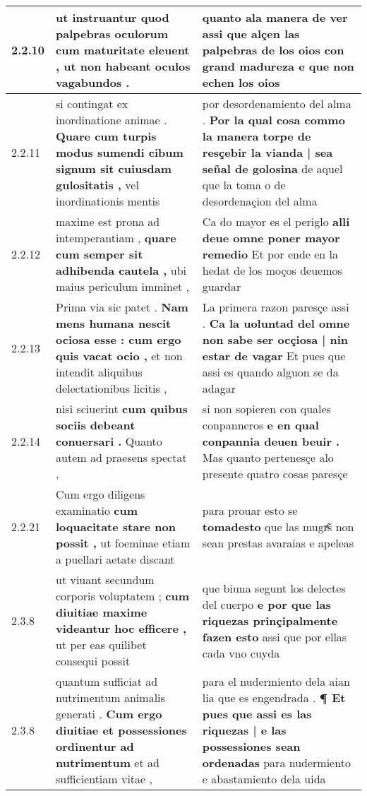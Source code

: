 \begin{tabular}{|p{1cm}|p{6.5cm}|p{6.5cm}|}
2.2.10 & ut instruantur quod palpebras oculorum \textbf{ cum maturitate eleuent , } ut non habeant oculos vagabundos . & quanto ala manera de ver \textbf{ assi que alçen las palpebras de los oios con grand madureza } e que non echen los oios \\\hline
2.2.11 & si contingat ex inordinatione animae . \textbf{ Quare cum turpis modus sumendi cibum signum sit cuiusdam gulositatis , } vel inordinationis mentis & por desordenamiento del alma . \textbf{ Por la qual cosa commo la manera torpe de resçebir la vianda | sea señal de golosina } de aquel que la toma o de desordenaçion del alma \\\hline
2.2.12 & maxime est prona ad intemperantiam , \textbf{ quare cum semper sit adhibenda cautela , } ubi maius periculum imminet , & Ca do mayor es el periglo \textbf{ alli deue omne poner mayor remedio } Et por ende en la hedat de los moços deuemos guardar \\\hline
2.2.13 & Prima via sic patet . \textbf{ Nam mens humana nescit ociosa esse : cum ergo quis vacat ocio , } et non intendit aliquibus delectationibus licitis , & La primera razon paresçe assi . \textbf{ Ca la uoluntad del omne non sabe ser ocçiosa | nin estar de vagar } Et pues que assi es quando alguon se da adagar \\\hline
2.2.14 & nisi sciuerint \textbf{ cum quibus sociis debeant conuersari . } Quanto autem ad praesens spectat , & si non sopieren con quales conpanneros \textbf{ e en qual conpannia deuen beuir . } Mas quanto pertenesçe alo presente quatro cosas paresçe \\\hline
2.2.21 & Cum ergo diligens examinatio \textbf{ cum loquacitate stare non possit , } ut foeminae etiam a puellari aetate discant & para prouar esto se \textbf{ tomadesto } que las mugrͣ̃s non sean prestas avaraias e apeleas \\\hline
2.3.8 & ut viuant secundum corporis voluptatem ; \textbf{ cum diuitiae maxime videantur hoc efficere , } ut per eas quilibet consequi possit & que biuna segunt los delectes del cuerpo \textbf{ e por que las riquezas prinçipalmente fazen esto } assi que por ellas cada vno cuyda \\\hline
2.3.8 & quantum sufficiat ad nutrimentum animalis generati . \textbf{ Cum ergo diuitiae et possessiones ordinentur ad nutrimentum } et ad sufficientiam vitae , & para el nudermiento dela aian lia que es engendrada . \textbf{ ¶ Et pues que assi es las riquezas | e las possessiones sean ordenadas } para nudermiento e abastamiento dela uida \\\hline

\end{tabular}
